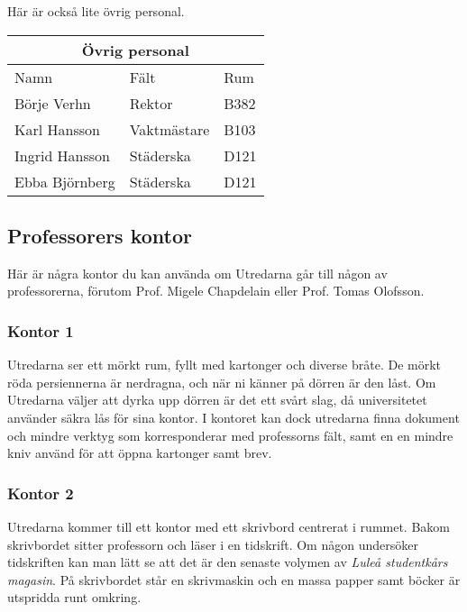 Här är också lite övrig personal.

\begin{center}
	\label{tab:OvrigPersonal}
	\begin{tabular}{ |p{3cm}|p{3cm}|p{3cm}|  }
		\hline
		\multicolumn{3}{|c|}{Övrig personal} \\
		\hline
		Namn & Fält & Rum \\ 
		\hline
		Börje Verhn & Rektor & B382 \\
		Karl Hansson & Vaktmästare & B103 \\
		Ingrid Hansson & Städerska & D121 \\
		Ebba Björnberg & Städerska & D121 \\
		\hline
	\end{tabular}
\end{center}


\subsection{Professorers kontor}
%
Här är några kontor du kan använda om Utredarna går till någon av professorerna, förutom Prof. Migele Chapdelain eller Prof. Tomas Olofsson.

\subsubsection*{Kontor 1}

Utredarna ser ett mörkt rum, fyllt med kartonger och diverse bråte. De mörkt röda persiennerna är nerdragna, och när ni känner på dörren är den låst. Om Utredarna väljer att dyrka upp dörren är det ett svårt slag, då universitetet använder säkra lås för sina kontor. I kontoret kan dock utredarna finna dokument och mindre verktyg som korresponderar med professorns fält, samt en en mindre kniv använd för att öppna kartonger samt brev.

\subsubsection*{Kontor 2}

Utredarna kommer till ett kontor med ett skrivbord centrerat i rummet. Bakom skrivbordet sitter professorn och läser i en tidskrift. Om någon undersöker tidskriften kan man lätt se att det är den senaste volymen av \textit{Luleå studentkårs magasin}. På skrivbordet står en skrivmaskin och en massa papper samt böcker är utspridda runt omkring.

